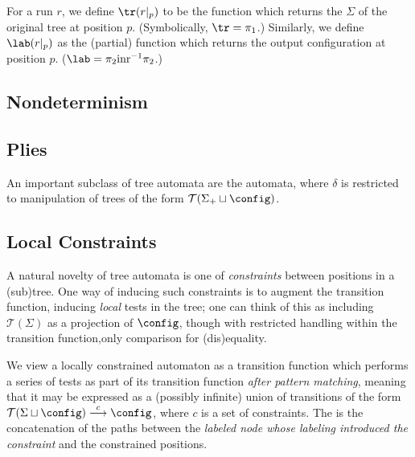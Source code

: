 For a run $r$, we define $\tr(r|_p)$ to be the function which returns the
$\Sigma$ of the original tree at position $p$. (Symbolically, $\tr =
\pi_1$.)
Similarly, we define 
$\lab(r|_p)$ as the (partial) function which returns
the output configuration at position $p$. ($\lab = \pi_2 \mbox{inr}^{-1}
\pi_2$.)

\subsection{Nondeterminism}

\subsection{Plies}

An important subclass of tree automata are the  automata,
where $\delta$ is restricted to manipulation of trees of the form
$\mathcal{T}(\Sigma_+ \sqcup \config)$.

% 

\subsection{Local Constraints}
\label{sec:treeaut:con:loc}

A natural novelty of tree automata is one of {\em constraints} between
positions in a (sub)tree.  One way of inducing such constraints is to
augment the transition function, inducing {\em local} tests in the tree; one
can think of this as including $\mathcal{T}(\Sigma)$ as a projection of
$\config$, though with restricted handling within the transition
function,\eg only comparison for (dis)equality.

We view a locally constrained automaton as a transition function which
performs a series of tests as part of its transition function {\em after
pattern matching}, meaning that it may be expressed as a (possibly infinite)
union of transitions of the form $\mathcal{T}(\Sigma \sqcup \config)
\stackrel{c}{\longrightarrow} \config$, where $c$ is a set of constraints.
The  is the concatenation of the paths between the
{\em labeled node whose labeling introduced the constraint} and the
constrained positions.

